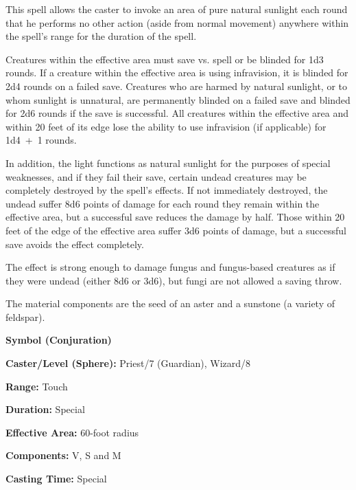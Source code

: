 \begin{multicols}{2}
\begin{minipage}{\columnwidth}
\end{minipage}

This spell allows the caster to invoke an area of pure natural sunlight each round that he performs no other action (aside from normal movement) anywhere within the spell's range for the duration of the spell.

Creatures within the effective area must save vs. spell or be blinded for 1d3 rounds.  If a creature within the effective area is using infravision, it is blinded for 2d4 rounds on a failed save.  Creatures who are harmed by natural sunlight, or to whom sunlight is unnatural, are permanently blinded on a failed save and blinded for 2d6 rounds if the save is successful.  All creatures within the effective area and within 20 feet of its edge lose the ability to use infravision (if applicable) for 1d4~+~1 rounds.

In addition, the light functions as natural sunlight for the purposes of special weaknesses, and if they fail their save, certain undead creatures may be completely destroyed by the spell's effects.  If not immediately destroyed, the undead suffer 8d6 points of damage for each round they remain within the effective area, but a successful save reduces the damage by half.  Those within 20 feet of the edge of the effective area suffer 3d6 points of damage, but a successful save avoids the effect completely.  

The effect is strong enough to damage fungus and fungus-based creatures as if they were undead (either 8d6 or 3d6), but fungi are not allowed a saving throw.

The material components are the seed of an aster and a sunstone (a variety of feldspar).

\vspace{1em}

\noindent
\begin{minipage}{\columnwidth}

\noindent \textbf{Symbol (Conjuration)}

\noindent \textbf{Caster/Level (Sphere):} Priest/7 (Guardian), Wizard/8

\noindent \textbf{Range:} Touch

\noindent \textbf{Duration:} Special

\noindent \textbf{Effective Area:} 60-foot radius

\noindent \textbf{Components:} V, S and M

\noindent \textbf{Casting Time:} Special


\end{minipage}
\end{multicols}
